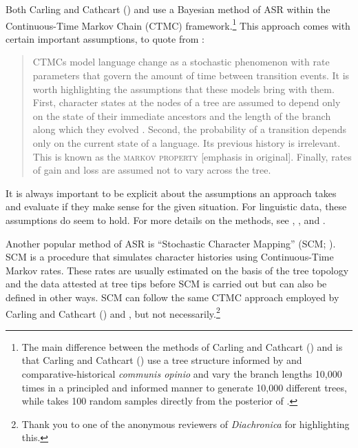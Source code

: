 \documentclass[12pt,letterpaper]{article}
\begin{document}
Both Carling and Cathcart (\citeyear{carling2021reconstructing}) and \citet{goldstein_2022} use a Bayesian method of ASR within the Continuous-Time Markov Chain (CTMC) framework.\footnote{The main difference between the methods of Carling and Cathcart (\citeyear{carling2021reconstructing}) and \citet{goldstein_2022} is that Carling and Cathcart (\citeyear{carling2021reconstructing}) use a tree structure informed by \citet{chang2015ancestry} and comparative-historical \textit{communis opinio} and vary the branch lengths 10,000 times in a principled and informed manner to generate 10,000 different trees, while \citet{goldstein_2022} takes 100 random samples directly from the posterior of \citet{chang2015ancestry}.} This approach comes with certain important assumptions, to quote from \citet[77]{goldstein_2022}:

\begin{quotation}
CTMCs model language change as a stochastic phenomenon with rate parameters that govern the amount of time between transition events. It is worth highlighting the assumptions that these models bring with them. First, character states at the nodes of a tree are assumed to depend only on the state of their immediate ancestors and the length of the branch along which they evolved \citep[4]{Cathcart_2018}. Second, the probability of a transition depends only on the current state of a language. Its previous history is irrelevant. This is known as the \textsc{markov property} [emphasis in original]. Finally, rates of gain and loss are assumed not to vary across the tree.
\end{quotation}

It is always important to be explicit about the assumptions an approach takes and evaluate if they make sense for the given situation. For linguistic data, these assumptions do seem to hold. For more details on the methods, see \citet{goldstein_2022}, \citet{pagel2004bayesian}, \citet{ronquist2004bayesian} and \citet{liggett2010continuous}. 

Another popular method of ASR is ``Stochastic Character Mapping'' (SCM; \citealt{huelsenbeck2003stochastic}). SCM is a procedure that simulates character histories using Continuous-Time Markov rates. These rates are usually estimated on the basis of the tree topology and the data attested at tree tips before SCM is carried out but can also be defined in other ways. SCM can follow the same CTMC approach employed by Carling and Cathcart (\citeyear{carling2021reconstructing}) and \citet{goldstein_2022}, but not necessarily.\footnote{Thank you to one of the anonymous reviewers of \textit{Diachronica} for highlighting this.}
\end{document}
